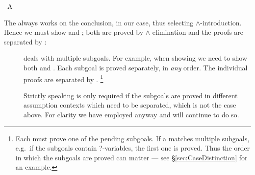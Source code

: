 \begin{isabellebody}
\ {\isachardoublequoteopen}A{\isachardoublequoteclose}\ \isacommand{{\isachardot}{\isachardot}}\isamarkupfalse%
\isanewline
{}\isamarkupfalse%
%
\endisatagproof
{\isafoldproof}%
%
\isadelimproof
%
\endisadelimproof
%
\begin{isamarkuptext}%
\noindent The  always works on the conclusion,
 in our case, thus selecting $\land$-introduction. Hence
we must show  and ; both are proved by
$\land$-elimination and the proofs are separated by :
\begin{description}
\item[] deals with multiple subgoals. For example,
when showing  we need to show both  and .  Each subgoal is proved separately, in \emph{any} order. The
individual proofs are separated by .  \footnote{Each
 must prove one of the pending subgoals.  If a
 matches multiple subgoals, e.g.\ if the subgoals
contain ?-variables, the first one is proved. Thus the order in which
the subgoals are proved can matter --- see
\S\ref{sec:CaseDistinction} for an example.}

Strictly speaking  is only required if the subgoals
are proved in different assumption contexts which need to be
separated, which is not the case above. For clarity we
have employed  anyway and will continue to do so.
\end{description}


\end{isamarkuptext}
\end{isabellebody}

